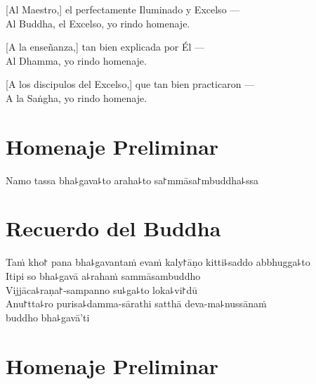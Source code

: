[Al Maestro,] el perfectamente Iluminado y Excelso ---\\
Al Buddha, el Excelso, yo rindo homenaje. 

[A la enseñanza,] tan bien explicada por Él ---\\
 Al Dhamma, yo rindo homenaje. 

[A los discipulos del Excelso,] que tan bien practicaron ---\\
A la Saṅgha, yo rindo homenaje. 

\clearpage

\chapter*{Homenaje Preliminar}

\begin{leader}
\end{leader}

Namo tassa bha꜕gava꜕to araha꜕to sa꜓mmāsa꜓mbuddha꜕ssa


\chapter*{Recuerdo del Buddha}

\delegateSetUseNext

\begin{leader}
\end{leader}

Taṁ kho꜓ pana bha꜕gavantaṁ evaṁ kaly꜓āṇo kitti꜕saddo abbhugga꜕to\\
Itipi so bha꜕gavā a꜕rahaṁ sammāsambuddho\\
Vijjāca꜕raṇa꜓-sampanno su꜕ga꜕to loka꜕vi꜓dū\\
Anu꜓tta꜕ro purisa꜕damma-sārathi satthā deva-ma꜕nussānaṁ\\
\vin buddho bha꜕gavā'ti

\clearpage

\chapter{Homenaje Preliminar}

\begin{leader}
\end{leader}


